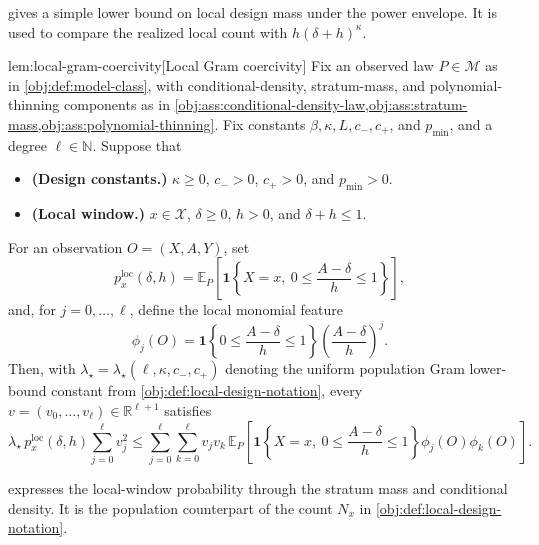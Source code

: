  gives a simple lower bound on local design mass under the power envelope. It is used to compare the realized local count with \(h(\delta+h)^\kappa\).

\begin{lemmav}{lem:local-gram-coercivity}[Local Gram coercivity]
Fix an observed law \(P\in\mathcal M\) as in \cref{obj:def:model-class}, with conditional-density, stratum-mass, and polynomial-thinning components as in \cref{obj:ass:conditional-density-law,obj:ass:stratum-mass,obj:ass:polynomial-thinning}.  Fix constants \(\beta,\kappa,L,c_-,c_+\), and \(p_{\min}\), and a degree \(\ell\in\mathbb N\).  Suppose that
\begin{itemize}
\item \textbf{(Design constants.)} \(\kappa\ge0\), \(c_->0\), \(c_+>0\), and \(p_{\min}>0\).
\item \textbf{(Local window.)} \(x\in\mathcal X\), \(\delta\ge0\), \(h>0\), and \(\delta+h\le1\).
\end{itemize}
For an observation \(O=(X,A,Y)\), set
\[
p_x^{\mathrm{loc}}(\delta,h)
=
\mathbb E_P\!\left[
\mathbf 1\!\left\{X=x,\ 0\le \frac{A-\delta}{h}\le 1\right\}
\right],
\]
and, for \(j=0,\ldots,\ell\), define the local monomial feature
\[
\phi_j(O)
=
\mathbf 1\!\left\{0\le \frac{A-\delta}{h}\le 1\right\}
\left(\frac{A-\delta}{h}\right)^j .
\]
Then, with \(\lambda_\star=\lambda_\star(\ell,\kappa,c_-,c_+)\) denoting the uniform population Gram lower-bound constant from \cref{obj:def:local-design-notation}, every \(v=(v_0,\ldots,v_\ell)\in\mathbb R^{\ell+1}\) satisfies
\[
\lambda_\star\,p_x^{\mathrm{loc}}(\delta,h)\sum_{j=0}^{\ell}v_j^2
\le
\sum_{j=0}^{\ell}\sum_{k=0}^{\ell}
v_jv_k\,
\mathbb E_P\!\left[
\mathbf 1\!\left\{X=x,\ 0\le \frac{A-\delta}{h}\le 1\right\}
\phi_j(O)\phi_k(O)
\right].
\]
\end{lemmav}

 expresses the local-window probability through the stratum mass and conditional density. It is the population counterpart of the count \(N_x\) in \cref{obj:def:local-design-notation}.

